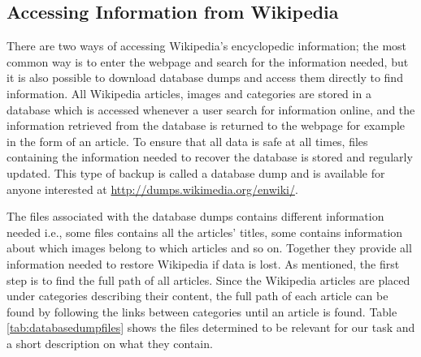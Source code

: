 
\subsection{Accessing Information from Wikipedia}
There are two ways of accessing Wikipedia’s encyclopedic information; the most common way is to enter the webpage and search for the information needed, but it is also possible to download database dumps and access them directly to find information. All Wikipedia articles, images and categories are stored in a database which is accessed whenever a user search for information online, and the information retrieved from the database is returned to the webpage for example in the form of an article. To ensure that all data is safe at all times, files containing the information needed to recover the database is stored and regularly updated.\cite{wiki:databasedownload} This type of backup is called a database dump and is available for anyone interested at \url{http://dumps.wikimedia.org/enwiki/}.

The files associated with the database dumps contains different information needed i.e., some files contains all the articles' titles, some contains information about which images belong to which articles and so on. Together they provide all information needed to restore Wikipedia if data is lost. 
As mentioned, the first step is to find the full path of all articles. Since the Wikipedia articles are placed under categories describing their content, the full path of each article can be found by following the links between categories until an article is found. Table \ref{tab:databasedumpfiles} shows the files determined to be relevant for our task and a short description on what they contain. 




